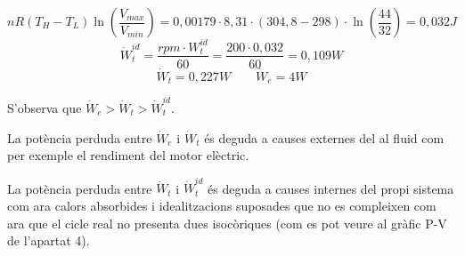 \documentclass[a4paper]{article}
\begin{document}
$$
nR(T_H - T_L)\ln\left(\frac{V_{max}}{V_{min}}\right) = 
0,00179·8,31·(304,8 - 298)·\ln\left(\frac{44}{32}\right) = \boxed{0,032 J}
$$
$$
\dot{W}_t^{id} = \frac{rpm·W_t^{id}}{60} = \frac{200·0,032}{60} = \boxed{0,109 W}
$$
$$
\dot{W}_t = 0,227 W \qquad \dot{W}_e = 4 W
$$

S'observa que $ \dot{W}_e > \dot{W}_t > \dot{W}_t^{id} $. 

La potència perduda entre $\dot{W}_e$ i $\dot{W}_t$ és deguda a causes externes del al fluid com per exemple el rendiment del motor elèctric.

La potència perduda entre $\dot{W}_t$ i $\dot{W}_t^{id}$ és deguda a causes internes del propi sistema com ara calors absorbides i idealitzacions suposades que no es compleixen com ara que el cicle real no presenta dues isocòriques (com es pot veure al gràfic P-V de l'apartat 4).
	
	
	
\end{document}
